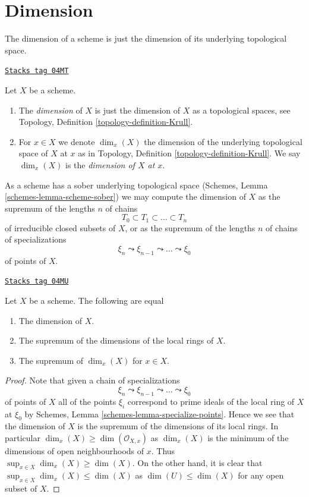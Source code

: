 \section{Dimension}
\label{properties-section-dimension}
The dimension of a scheme is just the dimension of its underlying
topological space.

\begin{definition}[Dimension]
\label{properties-definition-dimension}
\href{https://stacks.math.columbia.edu/tag/04MT}{\texttt{Stacks tag 04MT}}

Let $X$ be a scheme.
\begin{enumerate}
\item The {\it dimension} of $X$ is just the dimension of $X$
as a topological spaces, see
Topology, Definition \ref{topology-definition-Krull}.
\item For $x \in X$ we denote $\dim_x(X)$ the dimension of the underlying
topological space of $X$ at $x$ as in
Topology, Definition \ref{topology-definition-Krull}.
We say $\dim_x(X)$ is the {\it dimension of $X$ at $x$}.
\end{enumerate}
\end{definition}

As a scheme has a sober underlying topological space
(Schemes, Lemma \ref{schemes-lemma-scheme-sober})
we may compute the dimension of $X$ as the supremum of the lengths $n$
of chains
$$
T_0 \subset T_1 \subset \ldots \subset T_n
$$
of irreducible closed subsets of $X$, or as the supremum of the lengths $n$
of chains of specializations
$$
\xi_n \leadsto \xi_{n - 1} \leadsto \ldots \leadsto \xi_0
$$
of points of $X$.

\begin{lemma}[Dimension]
\label{properties-lemma-dimension}
\href{https://stacks.math.columbia.edu/tag/04MU}{\texttt{Stacks tag 04MU}}

Let $X$ be a scheme. The following are equal
\begin{enumerate}
\item The dimension of $X$.
\item The supremum of the dimensions of the local rings of $X$.
\item The supremum of $\dim_x(X)$ for $x \in X$.
\end{enumerate}
\end{lemma}

\begin{proof}
Note that given a chain of specializations
$$
\xi_n \leadsto \xi_{n - 1} \leadsto \ldots \leadsto \xi_0
$$
of points of $X$ all of the points $\xi_i$ correspond to prime ideals
of the local ring of $X$ at $\xi_0$ by
Schemes, Lemma \ref{schemes-lemma-specialize-points}.
Hence we see that the dimension of $X$ is the supremum of the dimensions
of its local rings. In particular $\dim_x(X) \geq \dim(\mathcal{O}_{X, x})$
as $\dim_x(X)$ is the minimum of the dimensions of open neighbourhoods of
$x$. Thus $\sup_{x \in X} \dim_x(X) \geq \dim(X)$. On the other hand,
it is clear that $\sup_{x \in X} \dim_x(X) \leq \dim(X)$
as $\dim(U) \leq \dim(X)$ for any open subset of $X$.
\end{proof}


